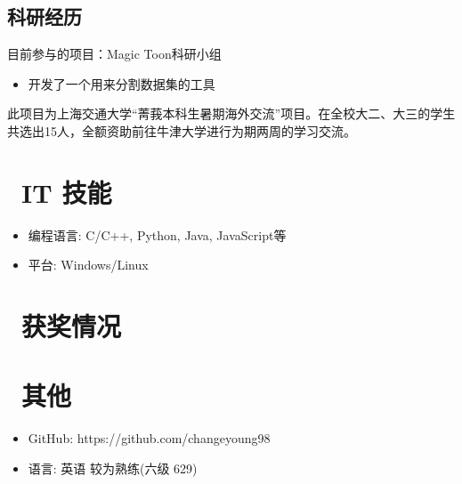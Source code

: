 \documentclass{resume}
\begin{document}
\subsection{\textbf{科研经历}}
目前参与的项目：Magic Toon科研小组
\begin{itemize}
  \item 开发了一个用来分割数据集的工具
\end{itemize}
此项目为上海交通大学“菁莪本科生暑期海外交流”项目。在全校大二、大三的学生共选出15人，全额资助前往牛津大学进行为期两周的学习交流。



\section{\faCogs\ IT 技能}
\begin{itemize}[parsep=0.5ex]
  \item 编程语言: C/C++, Python, Java, JavaScript等
  \item 平台: Windows/Linux
\end{itemize}

\section{\faHeartO\ 获奖情况}

\section{\faInfo\ 其他}
\begin{itemize}[parsep=0.5ex]
  \item GitHub: https://github.com/changeyoung98
  \item 语言: 英语 较为熟练(六级 629)
\end{itemize}

%
%
\end{document}
